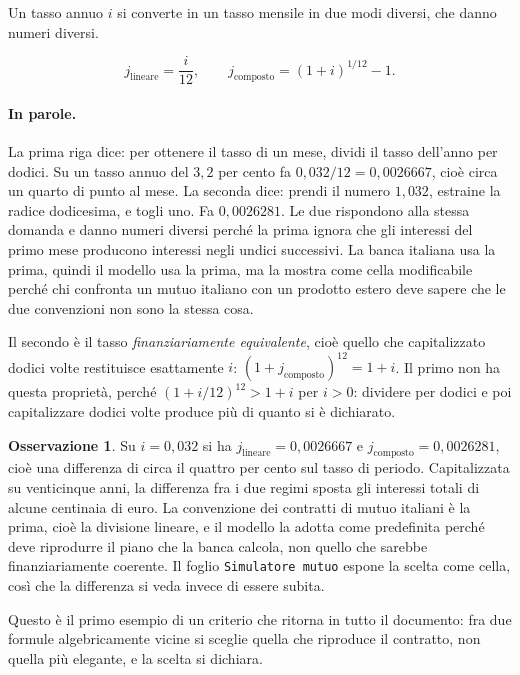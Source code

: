 \documentclass[11pt,a4paper]{article}
\theoremstyle{definition}
\newtheorem{osservazione}[definizione]{Osservazione}
\theoremstyle{plain}
\begin{document}
Un tasso annuo $i$ si converte in un tasso mensile in due modi diversi, che danno numeri diversi.

\begin{equation}
j_{\text{lineare}} = \frac{i}{12}, \qquad
j_{\text{composto}} = (1+i)^{1/12} - 1 .
\label{eq:conversione}
\end{equation}

\paragraph{In parole.} La prima riga dice: per ottenere il tasso di un mese, dividi il tasso dell'anno per dodici. Su un tasso annuo del $3{,}2$ per cento fa $0{,}032/12 = 0{,}0026667$, cioè circa un quarto di punto al mese. La seconda dice: prendi il numero $1{,}032$, estraine la radice dodicesima, e togli uno. Fa $0{,}0026281$. Le due rispondono alla stessa domanda e danno numeri diversi perché la prima ignora che gli interessi del primo mese producono interessi negli undici successivi. La banca italiana usa la prima, quindi il modello usa la prima, ma la mostra come cella modificabile perché chi confronta un mutuo italiano con un prodotto estero deve sapere che le due convenzioni non sono la stessa cosa.

Il secondo è il tasso \emph{finanziariamente equivalente}, cioè quello che capitalizzato dodici volte restituisce esattamente $i$: $(1+j_{\text{composto}})^{12} = 1+i$. Il primo non ha questa proprietà, perché $(1+i/12)^{12} > 1+i$ per $i>0$: dividere per dodici e poi capitalizzare dodici volte produce più di quanto si è dichiarato.

\begin{osservazione}
Su $i = 0{,}032$ si ha $j_{\text{lineare}} = 0{,}0026667$ e $j_{\text{composto}} = 0{,}0026281$, cioè una differenza di circa il quattro per cento sul tasso di periodo. Capitalizzata su venticinque anni, la differenza fra i due regimi sposta gli interessi totali di alcune centinaia di euro. La convenzione dei contratti di mutuo italiani è la prima, cioè la divisione lineare, e il modello la adotta come predefinita perché deve riprodurre il piano che la banca calcola, non quello che sarebbe finanziariamente coerente. Il foglio \texttt{Simulatore mutuo} espone la scelta come cella, così che la differenza si veda invece di essere subita.
\end{osservazione}

Questo è il primo esempio di un criterio che ritorna in tutto il documento: fra due formule algebricamente vicine si sceglie quella che riproduce il contratto, non quella più elegante, e la scelta si dichiara.
\end{document}
